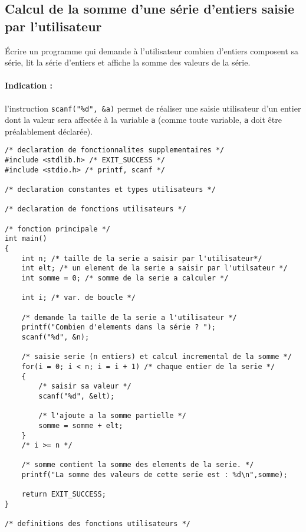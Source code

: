 \subsection{Calcul de la somme d'une série d'entiers saisie par l'utilisateur}

Écrire un programme  qui demande à l'utilisateur combien d'entiers
composent sa série, lit la série d'entiers et affiche la somme des
valeurs de la série.

\paragraph{Indication :} l'instruction
\verb+scanf("%d", &a)+
permet de réaliser une saisie utilisateur d'un entier dont la valeur
sera affectée à la variable \texttt{a} (comme toute variable, \texttt{a} doit
être préalablement déclarée).

\begin{correction}
\begin{verbatim}
/* declaration de fonctionnalites supplementaires */
#include <stdlib.h> /* EXIT_SUCCESS */
#include <stdio.h> /* printf, scanf */

/* declaration constantes et types utilisateurs */

/* declaration de fonctions utilisateurs */

/* fonction principale */
int main()
{
    int n; /* taille de la serie a saisir par l'utilisateur*/
    int elt; /* un element de la serie a saisir par l'utilsateur */
    int somme = 0; /* somme de la serie a calculer */

    int i; /* var. de boucle */

    /* demande la taille de la serie a l'utilisateur */
    printf("Combien d'elements dans la série ? ");
    scanf("%d", &n);

    /* saisie serie (n entiers) et calcul incremental de la somme */
    for(i = 0; i < n; i = i + 1) /* chaque entier de la serie */
    {
        /* saisir sa valeur */
        scanf("%d", &elt);

        /* l'ajoute a la somme partielle */
        somme = somme + elt;
    }
    /* i >= n */

    /* somme contient la somme des elements de la serie. */
    printf("La somme des valeurs de cette serie est : %d\n",somme);

    return EXIT_SUCCESS;
}

/* definitions des fonctions utilisateurs */
\end{verbatim}
\end{correction}


